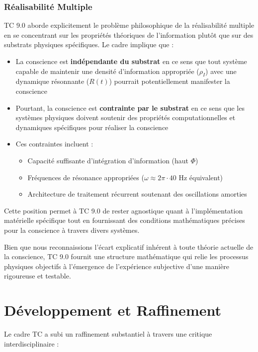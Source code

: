 \documentclass[12pt]{article}
\begin{document}
\subsubsection{Réalisabilité Multiple}
TC 9.0 aborde explicitement le problème philosophique de la réalisabilité multiple \cite{putnam1967} en se concentrant sur les propriétés théoriques de l'information plutôt que sur des substrats physiques spécifiques. Le cadre implique que :

\begin{itemize}
    \item La conscience est \textbf{indépendante du substrat} en ce sens que tout système capable de maintenir une densité d'information appropriée ($\rho_I$) avec une dynamique résonnante ($R(t)$) pourrait potentiellement manifester la conscience
    
    \item Pourtant, la conscience est \textbf{contrainte par le substrat} en ce sens que les systèmes physiques doivent soutenir des propriétés computationnelles et dynamiques spécifiques pour réaliser la conscience
    
    \item Ces contraintes incluent :
    \begin{itemize}[label=--]
        \item Capacité suffisante d'intégration d'information (haut $\Phi$)
        \item Fréquences de résonance appropriées ($\omega \approx 2\pi \cdot 40$ Hz équivalent)
        \item Architecture de traitement récurrent soutenant des oscillations amorties
    \end{itemize}
\end{itemize}

Cette position permet à TC 9.0 de rester agnostique quant à l'implémentation matérielle spécifique tout en fournissant des conditions mathématiques précises pour la conscience à travers divers systèmes.

Bien que nous reconnaissions l'écart explicatif inhérent à toute théorie actuelle de la conscience, TC 9.0 fournit une structure mathématique qui relie les processus physiques objectifs à l'émergence de l'expérience subjective d'une manière rigoureuse et testable.

\section{Développement et Raffinement}
Le cadre TC a subi un raffinement substantiel à travers une critique interdisciplinaire :
\end{document}
